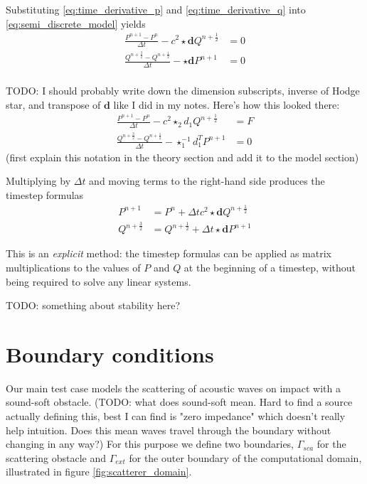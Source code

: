 \documentclass[utf8,english]{gradu3}
\begin{document}
Substituting \eqref{eq:time_derivative_p} and \eqref{eq:time_derivative_q}
into \eqref{eq:semi_discrete_model} yields
\begin{align*}
\frac{P^{n+1} - P^n}{\Delta t} - c^2 \star \mathbf{d} Q^{n+\frac{1}{2}} &= 0 \\
\frac{Q^{n+\frac{3}{2}} - Q^{n+\frac{1}{2}}}{\Delta t}
- \star \mathbf{d} P^{n+1} &= 0 \\
\end{align*}

TODO: I should probably write down the dimension subscripts,
inverse of Hodge star, and transpose of $\mathbf{d}$ like I did in my notes.
Here's how this looked there:
\begin{align*}
  \frac{P^{n+1} - P^n}{\Delta t} - c^2 \star_2 d_1 Q^{n+\frac{1}{2}} &= F \\
  \frac{Q^{n+\frac{3}{2}} - Q^{n+\frac{1}{2}}}{\Delta t}
  - \star_1^{-1} d_1^T P^{n+1} &= 0
\end{align*}
(first explain this notation in the theory section
and add it to the model section)

Multiplying by $\Delta t$ and moving terms to the right-hand side
produces the timestep formulas
\begin{align}
  \label{eq:timestep_p}
  P^{n+1} &= P^n + \Delta t c^2 \star \mathbf{d} Q^{n+\frac{1}{2}} \\
  \label{eq:timestep_q}
  Q^{n+\frac{3}{2}} &= Q^{n+\frac{1}{2}} + \Delta t \star \mathbf{d} P^{n+1}
\end{align}

This is an \textit{explicit} method:
the timestep formulas can be applied as matrix multiplications
to the values of $P$ and $Q$ at the beginning of a timestep,
without being required to solve any linear systems.

TODO: something about stability here?


\section{Boundary conditions}\label{sec:boundary_conditions}

Our main test case models the scattering of acoustic waves
on impact with a sound-soft obstacle.
(TODO: what does sound-soft mean. Hard to find a source actually defining this,
best I can find is "zero impedance" which doesn't really help intuition.
Does this mean waves travel through the boundary without changing in any way?)
For this purpose we define two boundaries,
$\Gamma_{sca}$ for the scattering obstacle
and $\Gamma_{ext}$ for the outer boundary of the computational domain,
illustrated in figure \ref{fig:scatterer_domain}.
\end{document}
